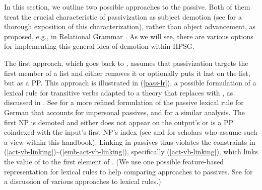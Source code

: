 \documentclass[output=paper
                ,modfonts
                ,nonflat
	        ,collection
	        ,collectionchapter
	        ,collectiontoclongg
 	        ,biblatex
                ,babelshorthands
                ,newtxmath
                ,draftmode
                ,colorlinks, citecolor=brown
]{./langsci/langscibook}
\begin{document}
In this section, we outline two possible approaches to 
the passive.  
Both of them treat the crucial characteristic of passivization as subject demotion (see \citealt{Blevins2003} for a thorough exposition of this characterization), rather than object advancement, as proposed, e.g., in Relational Grammar \citep{PerlmutterandPostal1983b}.
As we will see, there are various options for implementing this general idea of demotion within HPSG.

The first approach, which goes back to \citet{pollard+sag:1987}, assumes that passivization targets the first member of a  list and either removes it or optionally puts it last on the list, but as a PP.
This approach is illustrated in (\ref{pass-lr}), a possible formulation of a lexical rule for transitive verbs adapted to a theory that replaces  with \argst, as discussed in \citet[67]{Manning+Sag:1999}.
See \citealt{Mueller2000} for a  more refined formulation of the passive lexical rule for German that accounts for impersonal passives, and \citet{Blevins2003} for a similar analysis.
The first NP is demoted and either does not appear on the output's \argst or is a PP coindexed with the input's first NP's index (see  and  for scholars who assume such a view within this handbook).
Linking in passives thus violates the constraints in (\ref{act-vb-linking})--(\ref{emb-act-vb-linking}), specifically (\ref{act-vb-linking}), which links the value of  to the first element of \argst. (We use one possible feature-based representation for lexical rules to help comparing approaches to passives. See  for a discussion of various approaches to lexical rules.) 
\end{document}
